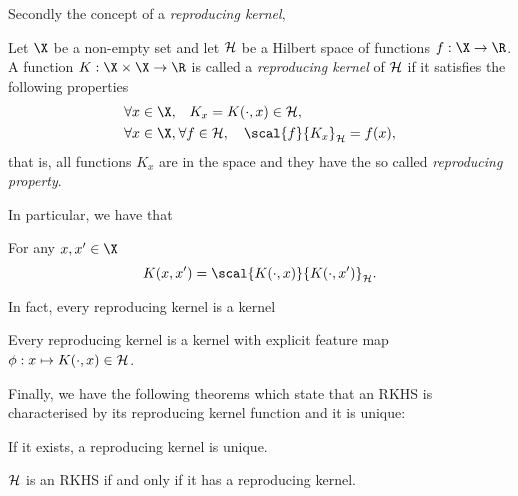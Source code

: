 Secondly the concept of a \emph{reproducing kernel},
\begin{definition}
\label{def:reproducing-kernel} Let \(\X\) be a non-empty set and let
\(\mathcal{H}\) be a Hilbert space of functions \(f: \X \to \R\). A function \(K:
\X \times \X \to \R\) is called a \textit{reproducing kernel} of \(\mathcal{H}\) if
it satisfies the following properties
\begin{align} \forall x \in \X, & \quad K_x = K(\cdot, x) \in
\rkhs{H}, \label{al:reproducer-in-rkhs}\\ \forall x \in \X, & \: \forall f \in
\rkhs{H}, \quad \scal{f}{K_x}_{\rkhs{H}} =
f(x), \label{al:reproducing-property-of-rkhs}
\end{align} that is, all functions \(K_x\) are in the space and they have the so
called \textit{reproducing property}.
\end{definition} In particular, we have that
\begin{corollary}
  \label{cor:reproducing-property-kxy} For any \(x, x' \in \X\)
  \begin{equation*} K(x, x') = \scal{K(\cdot, x)}{K(\cdot, x')}_{\rkhs{H}}.
  \end{equation*}
\end{corollary} In fact, every reproducing kernel is a kernel
\begin{corollary}
 \label{cor:reproducing-kernel-is-a-kernel} Every reproducing kernel is a kernel
with explicit feature map \(\phi : x \mapsto K(\cdot, x) \in \mathcal{H}\).
\end{corollary}

Finally, we have the following theorems which state that an RKHS is
characterised by its reproducing kernel function and it is unique:
\begin{theorem}
\label{th:rep-kernel-is-unique} If it exists, a reproducing kernel is unique.
\end{theorem}

\begin{theorem}
\label{th:rep-kernel-defines-rkhs} \(\mathcal{H}\) is an RKHS if and only if it has
a reproducing kernel.
\end{theorem}

